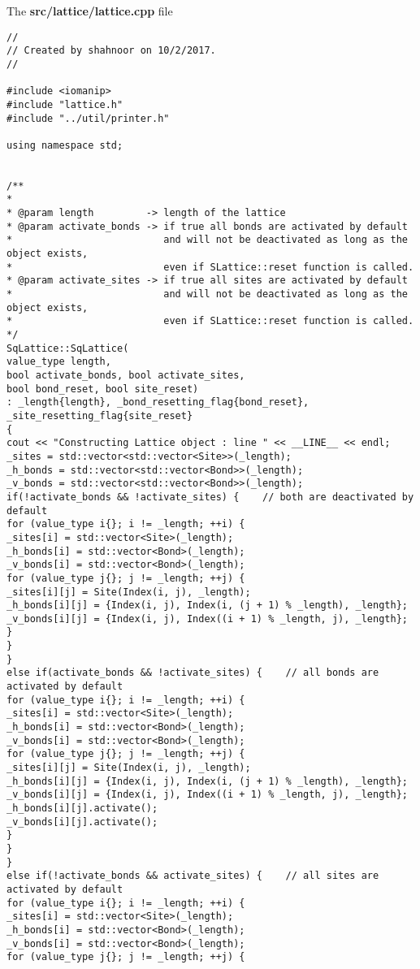 The \textbf{src/lattice/lattice.cpp} file
\begin{lstlisting}[style=CStyle]
//
// Created by shahnoor on 10/2/2017.
//

#include <iomanip>
#include "lattice.h"
#include "../util/printer.h"

using namespace std;


/**
*
* @param length         -> length of the lattice
* @param activate_bonds -> if true all bonds are activated by default
*                          and will not be deactivated as long as the object exists,
*                          even if SLattice::reset function is called.
* @param activate_sites -> if true all sites are activated by default
*                          and will not be deactivated as long as the object exists,
*                          even if SLattice::reset function is called.
*/
SqLattice::SqLattice(
value_type length,
bool activate_bonds, bool activate_sites,
bool bond_reset, bool site_reset)
: _length{length}, _bond_resetting_flag{bond_reset}, _site_resetting_flag{site_reset}
{
cout << "Constructing Lattice object : line " << __LINE__ << endl;
_sites = std::vector<std::vector<Site>>(_length);
_h_bonds = std::vector<std::vector<Bond>>(_length);
_v_bonds = std::vector<std::vector<Bond>>(_length);
if(!activate_bonds && !activate_sites) {    // both are deactivated by default
for (value_type i{}; i != _length; ++i) {
_sites[i] = std::vector<Site>(_length);
_h_bonds[i] = std::vector<Bond>(_length);
_v_bonds[i] = std::vector<Bond>(_length);
for (value_type j{}; j != _length; ++j) {
_sites[i][j] = Site(Index(i, j), _length);
_h_bonds[i][j] = {Index(i, j), Index(i, (j + 1) % _length), _length};
_v_bonds[i][j] = {Index(i, j), Index((i + 1) % _length, j), _length};
}
}
}
else if(activate_bonds && !activate_sites) {    // all bonds are activated by default
for (value_type i{}; i != _length; ++i) {
_sites[i] = std::vector<Site>(_length);
_h_bonds[i] = std::vector<Bond>(_length);
_v_bonds[i] = std::vector<Bond>(_length);
for (value_type j{}; j != _length; ++j) {
_sites[i][j] = Site(Index(i, j), _length);
_h_bonds[i][j] = {Index(i, j), Index(i, (j + 1) % _length), _length};
_v_bonds[i][j] = {Index(i, j), Index((i + 1) % _length, j), _length};
_h_bonds[i][j].activate();
_v_bonds[i][j].activate();
}
}
}
else if(!activate_bonds && activate_sites) {    // all sites are activated by default
for (value_type i{}; i != _length; ++i) {
_sites[i] = std::vector<Site>(_length);
_h_bonds[i] = std::vector<Bond>(_length);
_v_bonds[i] = std::vector<Bond>(_length);
for (value_type j{}; j != _length; ++j) {

\end{lstlisting}
